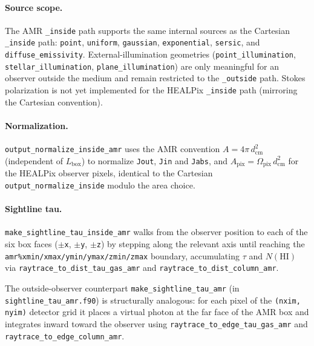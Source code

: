 \documentclass[english,a4paper]{my_memo}
\begin{document}
\paragraph{Source scope.}  The AMR \texttt{\_inside} path supports the
same internal sources as the Cartesian \texttt{\_inside} path: \texttt{point},
\texttt{uniform}, \texttt{gaussian}, \texttt{exponential}, \texttt{sersic},
and \texttt{diffuse\_emissivity}.  External-illumination geometries
(\texttt{point\_illumination}, \texttt{stellar\_illumination},
\texttt{plane\_illumination}) are only meaningful for an observer outside
the medium and remain restricted to the \texttt{\_outside} path.  Stokes
polarization is not yet implemented for the HEALPix \texttt{\_inside}
path (mirroring the Cartesian convention).

\begin{sloppypar}
\paragraph{Normalization.}  \texttt{output\_normalize\_inside\_amr} uses
the AMR convention $A = 4\pi\,d_\mathrm{cm}^2$ (independent of $L_\mathrm{box}$)
to normalize \texttt{Jout}, \texttt{Jin} and \texttt{Jabs}, and
$A_\mathrm{pix} = \Omega_\mathrm{pix}\,d_\mathrm{cm}^2$ for the HEALPix
observer pixels, identical to the Cartesian \texttt{output\_normalize\_inside}
modulo the area choice.
\end{sloppypar}

\begin{sloppypar}
\paragraph{Sightline tau.}  \texttt{make\_sightline\_tau\_inside\_amr}
walks from the observer position to each of the six box faces
(\texttt{$\pm$x}, \texttt{$\pm$y}, \texttt{$\pm$z}) by stepping along
the relevant axis until reaching the
\texttt{amr\%xmin/xmax/ymin/ymax/zmin/zmax} boundary, accumulating
$\tau$ and $N(\mathrm{HI})$ via
\texttt{raytrace\_to\_dist\_tau\_gas\_amr} and
\texttt{raytrace\_to\_dist\_column\_amr}.
\end{sloppypar}

\begin{sloppypar}
The outside-observer counterpart \texttt{make\_sightline\_tau\_amr}
(in \texttt{sightline\_tau\_amr.f90}) is structurally analogous: for
each pixel of the \texttt{(nxim, nyim)} detector grid it places a
virtual photon at the far face of the AMR box and integrates inward
toward the observer using \texttt{raytrace\_to\_edge\_tau\_gas\_amr}
and \texttt{raytrace\_to\_edge\_column\_amr}.
\end{sloppypar}
\end{document}
